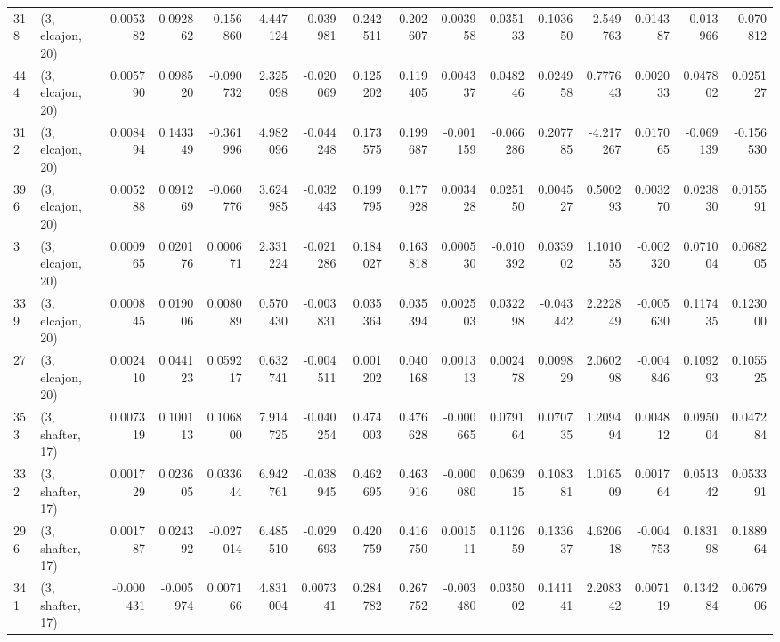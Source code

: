 \begin{tabular}{llrrrrrrrrrrrrrr}
318 &  (3, elcajon, 20) &   0.005382 &  0.092862 & -0.156860 &    4.447124 & -0.039981 &   0.242511 &  0.202607 &  0.003958 &  0.035133 &  0.103650 &   -2.549763 &  0.014387 & -0.013966 & -0.070812 \\
444 &  (3, elcajon, 20) &   0.005790 &  0.098520 & -0.090732 &    2.325098 & -0.020069 &   0.125202 &  0.119405 &  0.004337 &  0.048246 &  0.024958 &    0.777643 &  0.002033 &  0.047802 &  0.025127 \\
312 &  (3, elcajon, 20) &   0.008494 &  0.143349 & -0.361996 &    4.982096 & -0.044248 &   0.173575 &  0.199687 & -0.001159 & -0.066286 &  0.207785 &   -4.217267 &  0.017065 & -0.069139 & -0.156530 \\
396 &  (3, elcajon, 20) &   0.005288 &  0.091269 & -0.060776 &    3.624985 & -0.032443 &   0.199795 &  0.177928 &  0.003428 &  0.025150 &  0.004527 &    0.500293 &  0.003270 &  0.023830 &  0.015591 \\
3   &  (3, elcajon, 20) &   0.000965 &  0.020176 &  0.000671 &    2.331224 & -0.021286 &   0.184027 &  0.163818 &  0.000530 & -0.010392 &  0.033902 &    1.101055 & -0.002320 &  0.071004 &  0.068205 \\
339 &  (3, elcajon, 20) &   0.000845 &  0.019006 &  0.008089 &    0.570430 & -0.003831 &   0.035364 &  0.035394 &  0.002503 &  0.032298 & -0.043442 &    2.222849 & -0.005630 &  0.117435 &  0.123000 \\
27  &  (3, elcajon, 20) &   0.002410 &  0.044123 &  0.059217 &    0.632741 & -0.004511 &   0.001202 &  0.040168 &  0.001313 &  0.002478 &  0.009829 &    2.060298 & -0.004846 &  0.109293 &  0.105525 \\
353 &  (3, shafter, 17) &   0.007319 &  0.100113 &  0.106800 &    7.914725 & -0.040254 &   0.474003 &  0.476628 & -0.000665 &  0.079164 &  0.070735 &    1.209494 &  0.004812 &  0.095004 &  0.047284 \\
332 &  (3, shafter, 17) &   0.001729 &  0.023605 &  0.033644 &    6.942761 & -0.038945 &   0.462695 &  0.463916 & -0.000080 &  0.063915 &  0.108381 &    1.016509 &  0.001764 &  0.051342 &  0.053391 \\
296 &  (3, shafter, 17) &   0.001787 &  0.024392 & -0.027014 &    6.485510 & -0.029693 &   0.420759 &  0.416750 &  0.001511 &  0.112659 &  0.133637 &    4.620618 & -0.004753 &  0.183198 &  0.188964 \\
341 &  (3, shafter, 17) &  -0.000431 & -0.005974 &  0.007166 &    4.831004 &  0.007341 &   0.284782 &  0.267752 & -0.003480 &  0.035002 &  0.141141 &    2.208342 &  0.007119 &  0.134284 &  0.067906 \\

\end{tabular}
